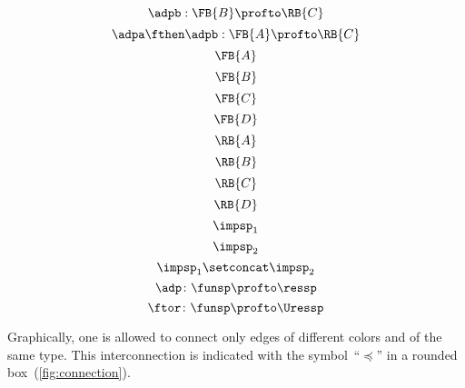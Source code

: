 {\begin{forslides}
\begin{equation}
		\end{equation}
		\begin{equation}
			\label{eq:adp2}
			\adpb: \FB{B} \profto  \RB{C}
		\end{equation}
		\begin{equation}
			\label{eq:adp1adp2}
			\adpa\fthen\adpb: \FB{A} \profto  \RB{C}
		\end{equation}
		\begin{equation}
			\label{eq:FA}
			\FB{A}
		\end{equation}
		\begin{equation}
			\label{eq:FB}
			\FB{B}
		\end{equation}
		\begin{equation}
			\label{eq:FC}
			\FB{C}
		\end{equation}
		\begin{equation}
			\label{eq:FD}
			\FB{D}
		\end{equation}
		\begin{equation}
			\label{eq:RA}
			\RB{A}
		\end{equation}
		\begin{equation}
			\label{eq:RB}
			\RB{B}
		\end{equation}
		\begin{equation}
			\label{eq:RC}
			\RB{C}
		\end{equation}
		\begin{equation}
			\label{eq:RD}
			\RB{D}
		\end{equation}
		\begin{equation}
			\label{eq:impsp1}
			\impsp_1
		\end{equation}
		\begin{equation}
			\label{eq:impsp2}
			\impsp_2
		\end{equation}
		\begin{equation}
			\label{eq:impsp12}
			\impsp_{1} \setconcat \impsp_{2}
		\end{equation}
		\begin{equation}
			\label{eq:dproba}
			\adp \colon \funsp \profto \ressp
		\end{equation}
		\begin{equation}
			\label{eq:dprob2}
			\ftor \colon \funsp \profto \Uressp
		\end{equation}
	\end{forslides}
}

Graphically, one is allowed to connect only edges of different colors and of the same type.
This interconnection is indicated with the symbol~``$\preceq$'' in a rounded box~(\cref{fig:connection}).

